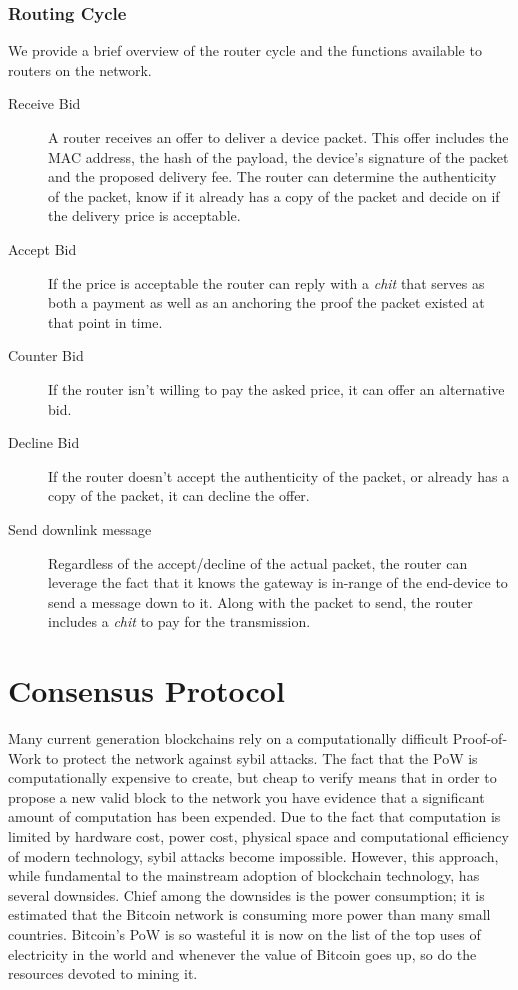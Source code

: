 \documentclass[letterpaper,11pt]{article}
\begin{document}
\subsubsection{Routing Cycle}

We provide a brief overview of the router cycle and the functions available to routers on the network.

\begin{description}
    \item [Receive Bid] A router receives an offer to deliver a device packet. This offer includes the MAC address, the hash of the payload, the device's signature of the packet and the proposed delivery fee. The router can determine the authenticity of the packet, know if it already has a copy of the packet and decide on if the delivery price is acceptable.
    \item [Accept Bid] If the price is acceptable the router can reply with a \emph{chit} that serves as both a payment as well as an anchoring the proof the packet existed at that point in time.
    \item [Counter Bid] If the router isn't willing to pay the asked price, it can offer an alternative bid.
    \item [Decline Bid] If the router doesn't accept the authenticity of the packet, or already has a copy of the packet, it can decline the offer.
    \item [Send downlink message] Regardless of the accept/decline of the actual packet, the router can leverage the fact that it knows the gateway is in-range of the end-device to send a message down to it. Along with the packet to send, the router includes a \emph{chit} to pay for the transmission.
\end{description}

\section{Consensus Protocol}\label{consensus}

Many current generation blockchains rely on a computationally difficult Proof-of-Work to protect the network against sybil attacks. The fact that the PoW is computationally expensive to create, but cheap to verify means that in order to propose a new valid block to the network you have evidence that a significant amount of computation has been expended. Due to the fact that computation is limited by hardware cost, power cost, physical space and computational efficiency of modern technology, sybil attacks become impossible. However, this approach, while fundamental to the mainstream adoption of blockchain technology, has several downsides. Chief among the downsides is the power consumption; it is estimated that the Bitcoin network is consuming more power than many small countries. Bitcoin's PoW is so wasteful it is now on the list of the top uses of electricity in the world and whenever the value of Bitcoin goes up, so do the resources devoted to mining it.
\end{document}
